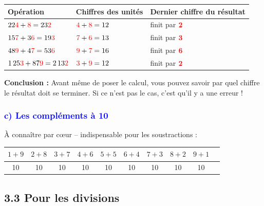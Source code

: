 \documentclass{exam}
\begin{document}
\begin{center}
\renewcommand{\arraystretch}{1.5}
\begin{tabular}{|l|l|l|}
\hline
\rowcolor{gray!20}
\textbf{Opération} & \textbf{Chiffres des unités} & \textbf{Dernier chiffre du résultat} \\
\hline
$22\textcolor{red}{4} + \textcolor{red}{8} = 23\textcolor{red}{2}$ & $\textcolor{red}{4} + \textcolor{red}{8} = 12$ & finit par $\textcolor{red}{\textbf{2}}$ \\
\hline
$15\textcolor{red}{7} + 3\textcolor{red}{6} = 19\textcolor{red}{3}$ & $\textcolor{red}{7} + \textcolor{red}{6} = 13$ & finit par $\textcolor{red}{\textbf{3}}$ \\
\hline
$48\textcolor{red}{9} + 4\textcolor{red}{7} = 53\textcolor{red}{6}$ & $\textcolor{red}{9} + \textcolor{red}{7} = 16$ & finit par $\textcolor{red}{\textbf{6}}$ \\
\hline
$1\,25\textcolor{red}{3} + 87\textcolor{red}{9} = 2\,13\textcolor{red}{2}$ & $\textcolor{red}{3} + \textcolor{red}{9} = 12$ & finit par $\textcolor{red}{\textbf{2}}$ \\
\hline
\end{tabular}
\end{center}

\textbf{Conclusion :} Avant même de poser le calcul, vous pouvez savoir par quel chiffre le résultat doit se terminer. Si ce n'est pas le cas, c'est qu'il y a une erreur !

\subsubsection*{\textcolor{blue}{c) Les compléments à 10}}

À connaître par c\oe ur -- indispensable pour les soustractions :

\begin{center}
\renewcommand{\arraystretch}{1.3}
\begin{tabular}{|c|c|c|c|c|c|c|c|c|c|}
\hline
\rowcolor{gray!20}
$1+9$ & $2+8$ & $3+7$ & $4+6$ & $5+5$ & $6+4$ & $7+3$ & $8+2$ & $9+1$ \\
\hline
10 & 10 & 10 & 10 & 10 & 10 & 10 & 10 & 10 \\
\hline
\end{tabular}
\end{center}

\vspace{0.5em}

\subsection*{\textcolor{blue!60!black}{3.3 Pour les divisions}}
\end{document}
